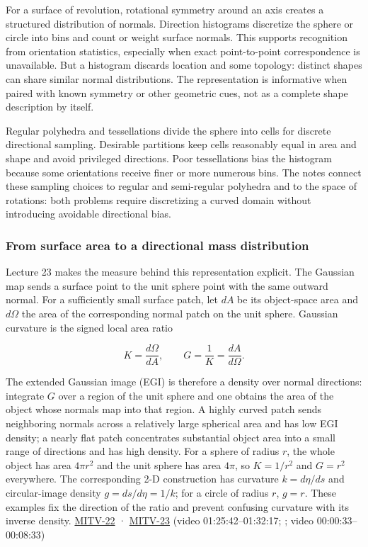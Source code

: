 For a surface of revolution, rotational symmetry around an axis creates a structured distribution of normals. Direction histograms discretize the sphere or circle into bins and count or weight surface normals. This supports recognition from orientation statistics, especially when exact point-to-point correspondence is unavailable. But a histogram discards location and some topology: distinct shapes can share similar normal distributions. The representation is informative when paired with known symmetry or other geometric cues, not as a complete shape description by itself.

Regular polyhedra and tessellations divide the sphere into cells for discrete directional sampling. Desirable partitions keep cells reasonably equal in area and shape and avoid privileged directions. Poor tessellations bias the histogram because some orientations receive finer or more numerous bins. The notes connect these sampling choices to regular and semi-regular polyhedra and to the space of rotations: both problems require discretizing a curved domain without introducing avoidable directional bias.

\subsubsection{From surface area to a directional mass distribution}\label{from-surface-area-to-a-directional-mass-distribution}

Lecture 23 makes the measure behind this representation explicit. The Gaussian map sends a surface point to the unit sphere point with the same outward normal. For a sufficiently small surface patch, let \(dA\) be its object-space area and \(d\Omega\) the area of the corresponding normal patch on the unit sphere. Gaussian curvature is the signed local area ratio

\[
K=\frac{d\Omega}{dA},\qquad G=\frac{1}{K}=\frac{dA}{d\Omega}.
\]

The extended Gaussian image (EGI) is therefore a density over normal directions: integrate \(G\) over a region of the unit sphere and one obtains the area of the object whose normals map into that region. A highly curved patch sends neighboring normals across a relatively large spherical area and has low EGI density; a nearly flat patch concentrates substantial object area into a small range of directions and has high density. For a sphere of radius \(r\), the whole object has area \(4\pi r^2\) and the unit sphere has area \(4\pi\), so \(K=1/r^2\) and \(G=r^2\) everywhere. The corresponding 2-D construction has curvature \(k=d\eta/ds\) and circular-image density \(g=ds/d\eta=1/k\); for a circle of radius \(r\), \(g=r\). These examples fix the direction of the ratio and prevent confusing curvature with its inverse density. \hyperref[04-visual-computing-ii-ch036]{MITV-22} · \hyperref[04-visual-computing-ii-ch036]{MITV-23} (video 01:25:42--01:32:17; ; video 00:00:33--00:08:33)

